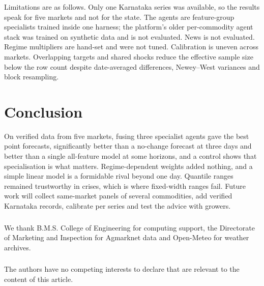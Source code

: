 \documentclass[runningheads]{llncs}
\begin{document}
Limitations are as follows. Only one Karnataka series was available, so the results speak for five markets and not for the state. The agents are feature-group specialists trained inside one harness; the platform's older per-commodity agent stack was trained on synthetic data and is not evaluated. News is not evaluated. Regime multipliers are hand-set and were not tuned. Calibration is uneven across markets. Overlapping targets and shared shocks reduce the effective sample size below the row count despite date-averaged differences, Newey--West variances and block resampling.

\section{Conclusion}
On verified data from five markets, fusing three specialist agents gave the best point forecasts, significantly better than a no-change forecast at three days and better than a single all-feature model at some horizons, and a control shows that specialisation is what matters. Regime-dependent weights added nothing, and a simple linear model is a formidable rival beyond one day. Quantile ranges remained trustworthy in crises, which is where fixed-width ranges fail. Future work will collect same-market panels of several commodities, add verified Karnataka records, calibrate per series and test the advice with growers.

\begin{credits}
\subsubsection{\ackname} We thank B.M.S. College of Engineering for computing support, the Directorate of Marketing and Inspection for Agmarknet data and Open-Meteo for weather archives.

\subsubsection{\discintname} The authors have no competing interests to declare that are relevant to the content of this article.
\end{credits}
\end{document}
